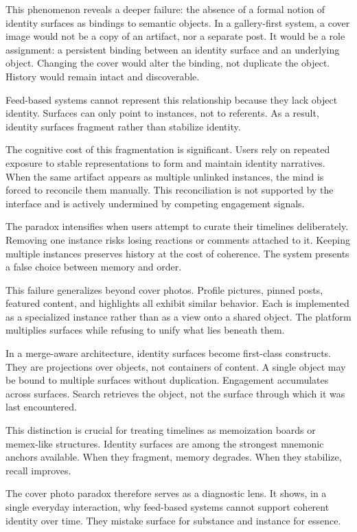 \documentclass[11pt,oneside]{article}
\begin{document}
This phenomenon reveals a deeper failure: the absence of a formal notion of identity surfaces as bindings to semantic objects. In a gallery-first system, a cover image would not be a copy of an artifact, nor a separate post. It would be a role assignment: a persistent binding between an identity surface and an underlying object. Changing the cover would alter the binding, not duplicate the object. History would remain intact and discoverable.

Feed-based systems cannot represent this relationship because they lack object identity. Surfaces can only point to instances, not to referents. As a result, identity surfaces fragment rather than stabilize identity.

The cognitive cost of this fragmentation is significant. Users rely on repeated exposure to stable representations to form and maintain identity narratives. When the same artifact appears as multiple unlinked instances, the mind is forced to reconcile them manually. This reconciliation is not supported by the interface and is actively undermined by competing engagement signals.

The paradox intensifies when users attempt to curate their timelines deliberately. Removing one instance risks losing reactions or comments attached to it. Keeping multiple instances preserves history at the cost of coherence. The system presents a false choice between memory and order.

This failure generalizes beyond cover photos. Profile pictures, pinned posts, featured content, and highlights all exhibit similar behavior. Each is implemented as a specialized instance rather than as a view onto a shared object. The platform multiplies surfaces while refusing to unify what lies beneath them.

In a merge-aware architecture, identity surfaces become first-class constructs. They are projections over objects, not containers of content. A single object may be bound to multiple surfaces without duplication. Engagement accumulates across surfaces. Search retrieves the object, not the surface through which it was last encountered.

This distinction is crucial for treating timelines as memoization boards or memex-like structures. Identity surfaces are among the strongest mnemonic anchors available. When they fragment, memory degrades. When they stabilize, recall improves.

The cover photo paradox therefore serves as a diagnostic lens. It shows, in a single everyday interaction, why feed-based systems cannot support coherent identity over time. They mistake surface for substance and instance for essence.
\end{document}
